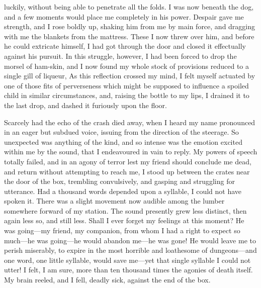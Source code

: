 luckily, without being able to penetrate all the folds. I was now beneath the
dog, and a few moments would place me completely in his power. Despair gave me
strength, and I rose boldly up, shaking him from me by main force, and dragging
with me the blankets from the mattress. These I now threw over him, and before
he could extricate himself, I had got through the door and closed it effectually
against his pursuit. In this struggle, however, I had been forced to drop the
morsel of ham-skin, and I now found my whole stock of provisions reduced to a
single gill of liqueur, As this reflection crossed my mind, I felt myself
actuated by one of those fits of perverseness which might be supposed to
influence a spoiled child in similar circumstances, and, raising the bottle to
my lips, I drained it to the last drop, and dashed it furiously upon the
floor. 

Scarcely had the echo of the crash died away, when I heard my name pronounced
in an eager but subdued voice, issuing from the direction of the steerage. So
unexpected was anything of the kind, and so intense was the emotion excited
within me by the sound, that I endeavoured in vain to reply. My powers of speech
totally failed, and in an agony of terror lest my friend should conclude me
dead, and return without attempting to reach me, I stood up between the crates
near the door of the box, trembling convulsively, and gasping and struggling for
utterance. Had a thousand words depended upon a syllable, I could not have
spoken it. There was a slight movement now audible among the lumber somewhere
forward of my station. The sound presently grew less distinct, then again less
so, and still less. Shall I ever forget my feelings at this moment? He was
going---my friend, my companion, from whom I had a right to expect so much---he
was going---he would abandon me---he was gone! He would leave me to perish
miserably, to expire in the most horrible and loathesome of dungeons---and one
word, one little syllable, would save me---yet that single syllable I could not
utter! I felt, I am sure, more than ten thousand times the agonies of death
itself. My brain reeled, and I fell, deadly sick, against the end of the
box. 

